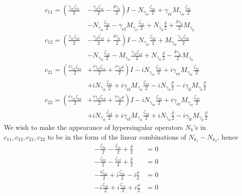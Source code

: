 \begin{align*}
  c_{11} = \left(\frac{\gamma_\text{er} \zeta_{21}}{2}\right.&\left.-\frac{\gamma_\text{el} \zeta_{11}}{2}-\frac{\delta \gamma_\text{il}}{2}\right) I -N_{\gamma_\text{er}} \frac{\zeta_{21}}{2}+\gamma_\text{er} M_{\gamma_\text{er}} \frac{\zeta_{21}}{2} \\
  &-N_{\gamma_\text{el}} \frac{\zeta_{11}}{2}-\gamma_\text{el} M_{\gamma_\text{el}} \frac{\zeta_{11}}{2}+N_{\gamma_\text{il}}\frac{\delta}{2} + \frac{\delta \gamma_\text{il}}{2} M_{\gamma_\text{il}}\\
  c_{12} = \left(\frac{\gamma_\text{er}\zeta_{22}}{2}\right.&\left.-\frac{\gamma_\text{el} \zeta_{12}}{2}+\frac{\delta \gamma_\text{ir}}{2}\right) I -N_{\gamma_\text{er}} \frac{\zeta_{22}}{2}+M_{\gamma_\text{er}} \frac{\gamma_\text{er} \zeta_{22}}{2} \\
  &-N_{\gamma_\text{el}} \frac{\zeta_{12}}{2}-M_{\gamma_\text{el}}\frac{ \gamma_\text{el} \zeta_{12}}{2}+N_{\gamma_\text{ir}}\frac{\delta}{2}-\frac{\delta\gamma_\text{ir}}{2} M_{\gamma_\text{ir}} \\
  c_{21} = \left(\frac{i \gamma_\text{er} \zeta_{21}}{2}\right.&\left.+\frac{i \gamma_\text{el} \zeta_{11}}{2}+\frac{i \gamma_\text{il} \rho}{2}\right) I-i N_{\gamma_\text{er}} \frac{\zeta_{21}}{2}+i \gamma_\text{er} M_{\gamma_\text{er}} \frac{\zeta_{21}}{2} \\
  &+i N_{\gamma_\text{el}} \frac{\zeta_{11}}{2}+i \gamma_\text{el} M_{\gamma_\text{el}} \frac{\zeta_{11}}{2}-i N_{\gamma_\text{il}} \frac{\rho}{2}-i \gamma_\text{il} M_{\gamma_\text{il}} \frac{\rho}{2} \\
  c_{22} = \left(\frac{i \gamma_\text{er} \zeta_{22}}{2}\right.&\left.+\frac{i \gamma_\text{el} \zeta_{12}}{2}+\frac{i \gamma_\text{ir} \rho}{2}\right) I -i N_{\gamma_\text{er}} \frac{\zeta_{22}}{2}+i \gamma_\text{er} M_{\gamma_\text{er}} \frac{\zeta_{22}}{2} \\
  &+i N_{\gamma_\text{el}} \frac{\zeta_{12}}{2}+i \gamma_\text{el} M_{\gamma_\text{el}} \frac{\zeta_{12}}{2}+i N_{\gamma_\text{ir}} \frac{\rho}{2}-i \gamma_\text{ir} M_{\gamma_\text{ir}} \frac{\rho}{2}
\end{align*}
We wish to make the appearance of hypersingular operators $N_k$'s in $c_{11}, c_{12}, c_{21}, c_{22}$ to be in the form of the linear combinations of $N_{k_1} - N_{k_2}$, hence
\begin{align*}
  -\frac{\zeta_{21}}{2}-\frac{\zeta_{11}}{2}+\frac{\delta}{2} &= 0 \\
  -\frac{\zeta_{22}}{2}-\frac{\zeta_{12}}{2}+\frac{\delta}{2} &= 0 \\
  -\frac{i \zeta_{21}}{2}+i \frac{\zeta_{11}}{2}-i \frac{\rho}{2} &= 0 \\
  -i \frac{\zeta_{22}}{2}+i \frac{\zeta_{12}}{2}+i \frac{\rho}{2} &= 0 \\
\end{align*}
